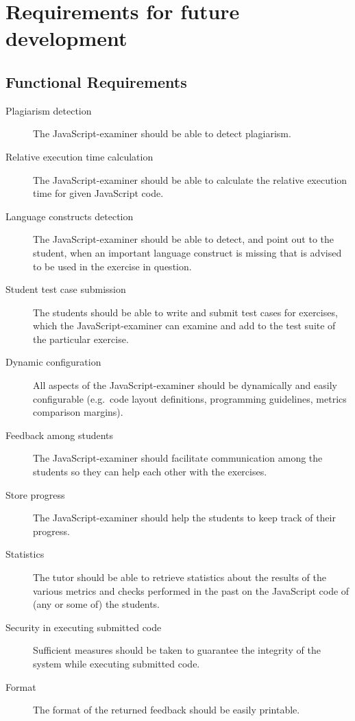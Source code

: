 \section{Requirements for future development}
\subsection{Functional Requirements}
\begin{description}
  \item[Plagiarism detection] The JavaScript-examiner should be able to detect
    plagiarism.
  \item[Relative execution time calculation] The JavaScript-examiner should be 
    able to calculate the relative execution time for given JavaScript code.
  \item[Language constructs detection] The JavaScript-examiner should be able
    to detect, and point out to the student, when an important language
    construct is missing that is advised to be used in the exercise in
    question.
  \item[Student test case submission] The students should be able to write and
    submit test cases for exercises, which the JavaScript-examiner can examine
    and add to the test suite of the particular exercise.
  \item[Dynamic configuration] All aspects of the JavaScript-examiner should be
    dynamically and easily configurable (e.g.\ code layout definitions,
    programming guidelines, metrics comparison margins).
  \item[Feedback among students] The JavaScript-examiner should facilitate 
    communication among the students so they can help each other with the 
    exercises. 
  \item[Store progress] The JavaScript-examiner should help the students to
    keep track of their progress.
  \item[Statistics] The tutor should be able to retrieve statistics about the
    results of the various metrics and \glspl{check} performed in the past on the
    JavaScript code of (any or some of) the students.
  \item[Security in executing submitted code] Sufficient measures should be
    taken to guarantee the integrity of the system while executing submitted
    code.
  \item[Format] The format of the returned feedback should be easily printable.
\end{description}


